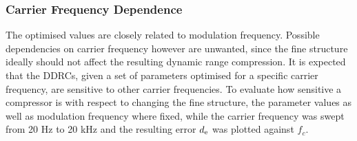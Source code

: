 \documentclass[../main2.tex]{subfiles}
\begin{document}
\subsubsection{Carrier Frequency Dependence}\label{method_carrier_freq_dep}
The optimised values are closely related to modulation frequency. Possible dependencies on carrier frequency however are unwanted, since the fine structure ideally should not affect the resulting dynamic range compression. It is expected that the DDRCs, given a set of parameters optimised for a specific carrier frequency, are sensitive to other carrier frequencies. To evaluate how sensitive a compressor is with respect to changing the fine structure, the parameter values as well as modulation frequency where fixed, while the carrier frequency was swept from 20 Hz to 20 kHz and the resulting error $d_\text{e}$ was plotted against $f_c$.
\end{document}
